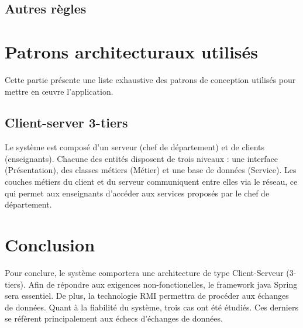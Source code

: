     
    \subsection{Autres règles}

\section{Patrons architecturaux utilisés}

    Cette partie présente une liste exhaustive des patrons de conception utilisés pour mettre en \oe uvre l'application.

    \subsection{Client-server 3-tiers}
    Le système est composé d'un serveur (chef de département) et de clients (enseignants). Chacune des entités disposent de trois niveaux : une interface (Présentation), des classes métiers (Métier) et une base de données (Service). Les couches métiers du client et du serveur communiquent entre elles via le réseau, ce qui permet aux enseignants d'accéder aux services proposés par le chef de département.
    
    

\section{Conclusion} 
    
    Pour conclure, le système comportera une architecture de type Client-Serveur (3-tiers). Afin de répondre aux exigences non-fonctionelles, le framework java Spring sera essentiel. De plus, la technologie RMI permettra de procéder aux échanges de données. Quant à la fiabilité du système, trois cas ont été étudiés. Ces derniers se réfèrent principalement aux échecs d'échanges de données.
    


